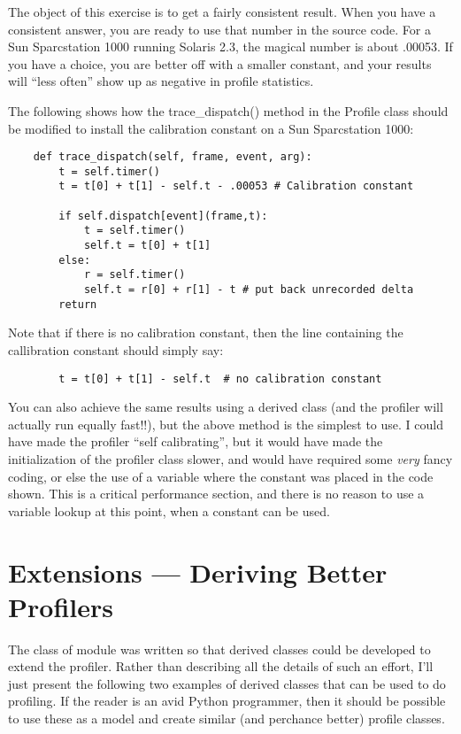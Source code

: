 The object of this exercise is to get a fairly consistent result.
When you have a consistent answer, you are ready to use that number in
the source code.  For a Sun Sparcstation 1000 running Solaris 2.3, the
magical number is about .00053.  If you have a choice, you are better
off with a smaller constant, and your results will ``less often'' show
up as negative in profile statistics.

The following shows how the trace_dispatch() method in the Profile
class should be modified to install the calibration constant on a Sun
Sparcstation 1000:

\begin{verbatim}
    def trace_dispatch(self, frame, event, arg):
        t = self.timer()
        t = t[0] + t[1] - self.t - .00053 # Calibration constant

        if self.dispatch[event](frame,t):
            t = self.timer()
            self.t = t[0] + t[1]
        else:
            r = self.timer()
            self.t = r[0] + r[1] - t # put back unrecorded delta
        return
\end{verbatim}

Note that if there is no calibration constant, then the line
containing the callibration constant should simply say:

\begin{verbatim}
        t = t[0] + t[1] - self.t  # no calibration constant
\end{verbatim}

You can also achieve the same results using a derived class (and the
profiler will actually run equally fast!!), but the above method is
the simplest to use.  I could have made the profiler ``self
calibrating'', but it would have made the initialization of the
profiler class slower, and would have required some \emph{very} fancy
coding, or else the use of a variable where the constant 
was placed in the code shown.  This is a  critical
performance section, and there is no reason to use a variable lookup
at this point, when a constant can be used.


\section{Extensions --- Deriving Better Profilers}

The  class of module  was written so that
derived classes could be developed to extend the profiler.  Rather
than describing all the details of such an effort, I'll just present
the following two examples of derived classes that can be used to do
profiling.  If the reader is an avid Python programmer, then it should
be possible to use these as a model and create similar (and perchance
better) profile classes.

